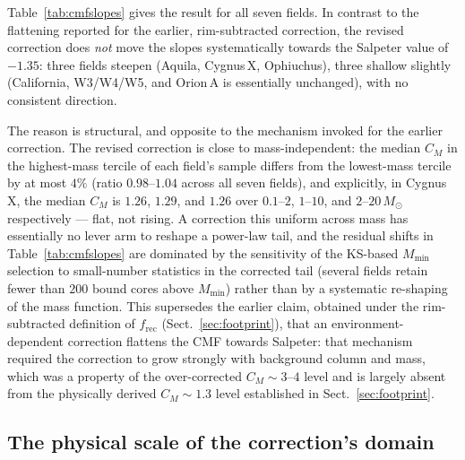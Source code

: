 \documentclass[11pt,a4paper]{article}
\newcommand{\msun}{M_{\odot}}
\begin{document}
Table~\ref{tab:cmfslopes} gives the result for all seven fields. In contrast
to the flattening reported for the earlier, rim-subtracted correction, the
revised correction does \emph{not} move the slopes systematically towards the
Salpeter value of $-1.35$: three fields steepen (Aquila, Cygnus\,X,
Ophiuchus), three shallow slightly (California, W3/W4/W5, and Orion\,A is
essentially unchanged), with no consistent direction.

The reason is structural, and opposite to the mechanism invoked for the
earlier correction. The revised correction is close to mass-independent: the
median $C_M$ in the highest-mass tercile of each field's sample differs from
the lowest-mass tercile by at most $4\%$ (ratio $0.98$--$1.04$ across all
seven fields), and explicitly, in Cygnus\,X, the median $C_M$ is $1.26$, $1.29$,
and $1.26$ over $0.1$--$2$, $1$--$10$, and $2$--$20\,\msun$ respectively ---
flat, not rising. A correction this uniform across mass has essentially no
lever arm to reshape a power-law tail, and the residual shifts in
Table~\ref{tab:cmfslopes} are dominated by the sensitivity of the KS-based
$M_{\mathrm{min}}$ selection to small-number statistics in the corrected
tail (several fields retain fewer than $200$ bound cores above
$M_{\mathrm{min}}$) rather than by a systematic re-shaping of the mass
function. This supersedes the earlier claim, obtained under the rim-subtracted
definition of $f_{\mathrm{rec}}$ (Sect.~\ref{sec:footprint}), that an
environment-dependent correction flattens the CMF towards Salpeter: that
mechanism required the correction to grow strongly with background column
and mass, which was a property of the over-corrected $C_M\sim3$--$4$ level and
is largely absent from the physically derived $C_M\sim1.3$ level established
in Sect.~\ref{sec:footprint}.

\subsection{The physical scale of the correction's domain}
\label{sec:lowmass}
\end{document}
